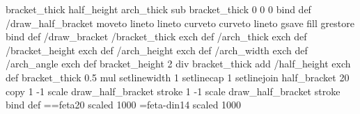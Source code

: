 {{%
	bracket_thick half_height arch_thick sub  %
	bracket_thick 0  %
	0 0  %
} bind def  %
/draw_half_bracket {  %
	moveto  %
	lineto  %
	lineto  %
	curveto  %
	curveto  %
	lineto  %
	gsave  %
	fill  %
	grestore  %
} bind def  %
/draw_bracket %
{  %
	/bracket_thick exch def %
	/arch_thick exch def %
	/bracket_height exch def %
	/arch_height exch def %
	/arch_width exch def %
	/arch_angle exch def %
	bracket_height 2 div bracket_thick add /half_height exch def  %
	bracket_thick 0.5 mul setlinewidth %
	1 setlinecap  %
	1 setlinejoin  %
	half_bracket  %
	20 copy  %
	1 -1 scale  %
	draw_half_bracket  %
	stroke  %
	1 -1 scale  %
	draw_half_bracket  %
	stroke  %
} bind def  %
} \outputscale=\lilypondpaperoutputscale \lilypondpaperunit\turnOnPostScript\font\magfontAOYTomMMBo=feta20 scaled 1000 
\font\magfontOHZTomMMBo=feta-din14 scaled 1000 
